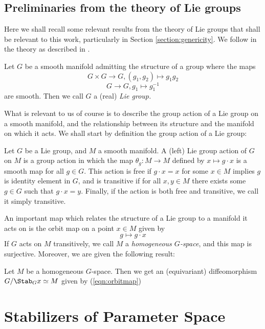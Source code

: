 \documentclass[11pt,letterpaper]{amsart}
\begin{document}
\subsection{Preliminaries from the theory of Lie groups} Here we shall recall some relevant results from the theory of Lie groups that shall be relevant to this work, particularly in Section \ref{section:genericity}. We follow in the theory as described in \cite[Ch. 7, 21]{Lee_2013}.
\begin{defin}
    Let $G$ be a smooth manifold admitting the structure of a group where the maps
    $$
    G\times G \rightarrow G, (g_1, g_2)\mapsto g_1g_2
    $$
    $$
    G \rightarrow G, g_1 \mapsto g_1^{-1}
    $$
    are smooth. Then we call $G$ a (real) \textit{Lie group.}
\end{defin}
What is relevant to us of course is to describe the group action of a Lie group on a smooth manifold, and the relationship between its structure and the manifold on which it acts. We shall start by definition the group action of a Lie group:
\begin{defin}
    \par Let $G$ be a Lie group, and $M$ a smooth manifold. A (left) Lie group action of $G$ on $M$ is a group action in which the map $\theta_g: M\rightarrow M$ defined by $x\mapsto g\cdot x$ is a smooth map for all $g\in G$. This action is free if $g\cdot x= x$ for some $x\in M$ implies $g$ is identity element in $G$, and is transitive if for all $x, y\in M$ there exists some $g\in G$ such that $g\cdot x = y$. Finally, if the action is both free and transitive, we call it simply transitive. 
\end{defin}
An important map which relates the structure of a Lie group to a manifold it acts on is the orbit map on a point $x\in M$ given by
\begin{equation}\label{eqn:orbitmap}
    g \mapsto g\cdot x
\end{equation}
If $G$ acts on $M$ transitively, we call $M$ a \textit{homogeneous $G$-space}, and this map is surjective. Moreover, we are given the following result:
\begin{lemma}\label{lemma:LeeLemmaGSpace}
    Let $M$ be a homogeneous $G$-space. Then we get an (equivariant) diffeomorphism $G/\Stab_{G}x\simeq M$ given by (\ref{eqn:orbitmap})
\end{lemma}
\section{Stabilizers of Parameter Space}\label{section:stabilizers}
\end{document}
